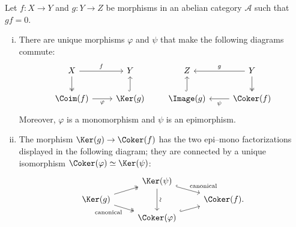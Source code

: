 \begin{lemma}\label{prop:image-to-kernel}
	Let $f:X\to Y$ and $g:Y\to Z$ be morphisms in an abelian category
	$\mathcal{A}$ such that $gf=0$.
	\begin{enumerate}[(i)]
		\item There are unique morphisms $\varphi$ and $\psi$ that make the
		following diagrams commute:
		\begin{equation}\label{eqn:cplx-transition}
		\begin{tikzcd}
			X \arrow[r, "f"] \arrow[twoheadrightarrow, d] & Y \\
			\Coim(f) \arrow[r, "\varphi"'] & \Ker(g) \arrow[hookrightarrow, u]
		\end{tikzcd} \qquad
		\begin{tikzcd}
			Z & Y \arrow[twoheadrightarrow, d] \arrow[l, "g"'] \\
			\Image(g) \arrow[hookrightarrow, u] & \Coker(f) \arrow[l, "\psi"]
		\end{tikzcd}
		\end{equation}
		Moreover, $\varphi$ is a monomorphism and $\psi$ is an epimorphism.

		\item The morphism $\Ker(g)\to\Coker(f)$ has the two epi--mono
		factorizations displayed in the following diagram; they are connected by
		a unique isomorphism $\Coker(\varphi)\simeq\Ker(\psi)$:
		\[\begin{tikzcd}[row sep=tiny]
			& \Ker(\psi) \arrow[hookrightarrow, rd, "\text{canonical}"] \arrow[dd, "\sim" sloped] & \\
			\Ker(g) \arrow[twoheadrightarrow, ru] \arrow[twoheadrightarrow, rd, "\text{canonical}"'] & & \Coker(f) . \\
			& \Coker(\varphi) \arrow[hookrightarrow, ru] &
		\end{tikzcd}\]
	\end{enumerate}
\end{lemma}

